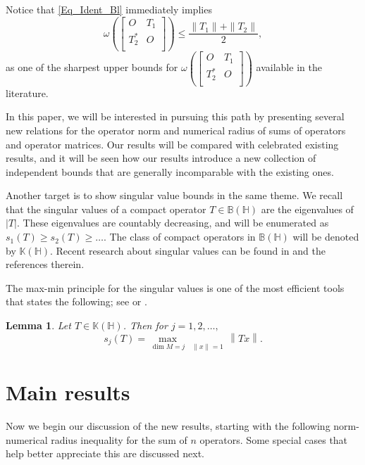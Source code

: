 \documentclass[12pt,twoside,reqno]{amsart}
\newtheorem{lemma}{Lemma}[section]
\numberwithin{equation}{section}
\begin{document}
Notice that \eqref{Eq_Ident_Bl} immediately implies
\begin{equation}\label{Eq_Bound_Bl_1}
\omega \left( \left[ \begin{matrix}
   O & {{T}_{1}}  \\
   T_{2}^{*} & O  \\
\end{matrix} \right] \right)\leq\frac{\|T_1\|+\|T_2\|}{2},
\end{equation}
as one of the sharpest upper bounds for $\omega \left( \left[ \begin{matrix}
   O & {{T}_{1}}  \\
   T_{2}^{*} & O  \\
\end{matrix} \right] \right)$ available in the literature.

In this paper, we will be interested in pursuing this path by presenting several new relations for the operator norm and numerical radius of sums of operators and operator matrices. Our results will be compared with celebrated existing results, and it will be seen how our results introduce a new collection of independent bounds that are generally incomparable with the existing ones.

Another target is to show singular value bounds in the same theme. We recall that the singular values of a compact operator $T\in\mathbb{B}(\mathbb{H})$ are the eigenvalues of $|T|.$ These eigenvalues are countably decreasing, and will be enumerated as $s_1(T)\geq s_2(T)\geq\ldots.$ The class of compact operators in $\mathbb{B}(\mathbb{H})$ will be denoted by $\mathbb{K}(\mathbb{H}).$ Recent research about singular values can be found in \cite{Kittaneh_MIA_2024,Moradi_AMP_2023,Sababheh_JMI_2022,Zhao_Filomat_2022,Zou_LAA_2017} and the references therein. 

The max-min principle for the singular values is one of the most efficient tools that states the following; see \cite[Theorem 1.5]{Simon_Book_1979} or \cite[Theorem 9.1]{Gohberg_Book_2003}.
\begin{lemma}\label{lem_maxmin}
Let $T\in\mathbb{K}(\mathbb{H})$. Then  for $j=1,2,\ldots,$
\[s_j(T)=\underset{\dim M=j}{\mathop{\max }}\,\underset{\left\| x \right\|=1}{\mathop{\underset{x\in M}{\mathop{\min }}\,}}\,\left\| Tx \right\|.\]
\end{lemma}
\section{Main results}
Now we begin our discussion of the new results, starting with the following norm-numerical radius inequality for the sum of $n$ operators. Some special cases that help better appreciate this are discussed next.
\end{document}
